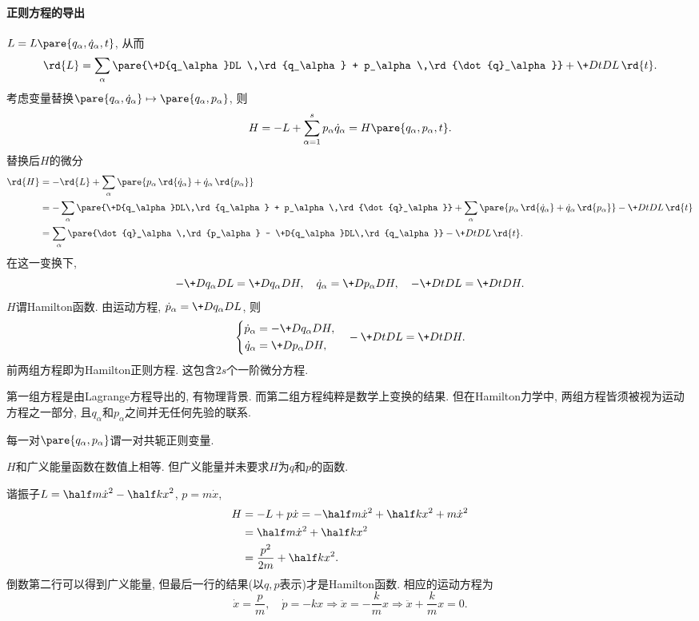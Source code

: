 \documentclass[../LectureNotes.tex]{subfiles}
\begin{document}

\paragraph{正则方程的导出} %
\label{par:正则方程的导出}

$L = L\pare{q_\alpha,\dot{q}_\alpha,t}$, 从而
\[ \rd{L} = \sum_\alpha \pare{\+D{q_\alpha}DL \,\rd{q_\alpha} + p_\alpha\,\rd{\dot{q}_\alpha}} + \+DtDL\,\rd{t}. \]
考虑变量替换$\pare{q_\alpha,\dot{q}_\alpha}\mapsto \pare{q_\alpha,p_\alpha}$, 则
\[ H = -L + \sum_{\alpha=1}^s p_\alpha \dot{q}_\alpha = H\pare{q_\alpha,p_\alpha,t}. \]
替换后$H$的微分
\begin{align*}
    \rd{H} &= -\rd{L} + \sum_\alpha\pare{p_\alpha \,\rd{\dot{q}_\alpha} + \dot{q}_\alpha\,\rd{p_\alpha}} \\
    &= -\sum_\alpha \pare{\+D{q_\alpha}DL\,\rd{q_\alpha} + p_\alpha\,\rd{\dot{q}_\alpha}} + \sum_\alpha \pare{p_\alpha\,\rd{\dot{q}_\alpha} + \dot{q}_\alpha\,\rd{p_\alpha}} - \+DtDL\,\rd{t} \\
    &= \sum_\alpha \pare{\dot{q}_\alpha \,\rd{p_\alpha} - \+D{q_\alpha}DL\,\rd{q_\alpha}} - \+DtDL\,\rd{t}.
\end{align*}
在这一变换下,
\[ -\+D{q_\alpha}DL = \+D{q_\alpha}DH,\quad \dot{q}_\alpha = \+D{p_\alpha}DH,\quad -\+DtDL = \+DtDH. \]
$H$谓Hamilton函数. 由运动方程, $\dot{p}_\alpha = \displaystyle \+D{q_\alpha}DL$, 则
\[ \left\{ \begin{aligned}
    \dot{p}_\alpha &= -\+D{q_\alpha}DH, \\
    \dot{q}_\alpha &= \+D{p_\alpha}DH,
\end{aligned} \right.\quad -\+DtDL = \+DtDH. \]
前两组方程即为Hamilton正则方程. 这包含$2s$个一阶微分方程.
\begin{remark}
    第一组方程是由Lagrange方程导出的, 有物理背景. 而第二组方程纯粹是数学上变换的结果. 但在Hamilton力学中, 两组方程皆须被视为运动方程之一部分, 且$q_\alpha$和$p_\alpha$之间并无任何先验的联系.
\end{remark}
每一对$\pare{q_\alpha,p_\alpha}$谓一对共轭正则变量.
\begin{remark}
    $H$和广义能量函数在数值上相等. 但广义能量并未要求$H$为$q$和$p$的函数.
\end{remark}
\begin{ex}
    谐振子$\displaystyle L = \half m\dot{x}^2 - \half kx^2$, $\displaystyle p = m\dot{x}$,
    \begin{align*}
        H &= -L + p\dot{x} = -\half m\dot{x}^2 + \half kx^2 + m\dot{x}^2 \\
        &= \half m\dot{x}^2 + \half kx^2 \\
        &= \frac{p^2}{2m} + \half kx^2.
    \end{align*}
    倒数第二行可以得到广义能量, 但最后一行的结果(以$q,p$表示)才是Hamilton函数. 相应的运动方程为
    \[ \dot{x} = \frac{p}{m},\quad \dot{p} = -kx\Rightarrow \ddot{x} = -\frac{k}{m}x \Rightarrow \ddot{x} + \frac{k}{m}x = 0. \]
\end{ex}
\end{document}
